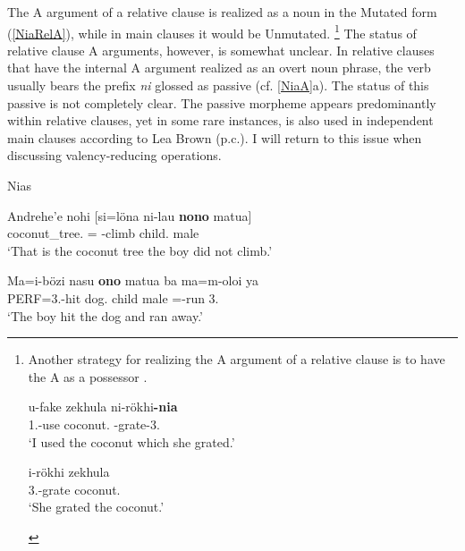 The A argument of a relative clause is realized as a noun in the Mutated form (\ref{NiaRelA}), while in main clauses it would be Unmutated.
\footnote{Another strategy for realizing the A argument of a relative clause is to have the A as a possessor \citep[420]{Brown:2001}. 

\begin{exe}\ex 
\begin{xlist}
\ex\gll u-fake zekhula ni-r\"okhi\textbf{-nia}\\
1\sg{}.\rls{}-use coconut.\mut{} \pass{}-grate-3\sg{}.\poss{}\\
`I used the coconut which she grated.' %

\ex\gll i-r\"okhi zekhula\\
3\sg{}.\rls{}-grate coconut.\mut{}\\
`She grated the coconut.'
\end{xlist} 
\end{exe}}
The status of relative clause A arguments, however, is somewhat unclear. 
In relative clauses that have the internal A argument realized as an overt noun phrase,  the verb usually bears the prefix \emph{ni} glossed as passive (cf. \ref{NiaA}a). 
The status of this passive is not completely clear. 
The passive morpheme appears predominantly within relative clauses, yet in some rare instances, is also used in independent main clauses according to Lea Brown (p.c.). 
I will return to this issue when discussing valency-reducing operations.

\enlargethispage{\baselineskip}
\begin{exe}\ex\label{NiaA} 
{Nias} \citep[422]{Brown:2001}\nopagebreak[4]
\begin{xlist} 
\ex\label{NiaRelA}\gll Andrehe'e  nohi {\rm[}si=l\"ona ni-lau \textbf{nono} matua{\rm]}\\
\dist{} coconut\_tree.\mut{} \relativ{}=\Neg{} \pass{}-climb child.\mut{} male\\
`That is the coconut tree the boy did not climb.'

\ex\label{NiaMainA}\gll Ma=i-b\"ozi nasu \textbf{ono} matua ba ma=m-oloi ya\\
PERF=3\sg{}.\rls{}-hit dog.\mut{} child male \conj{} \pfv{}=\dyn{}-run 3\sg{}.\mut{}\\
`The boy hit the dog and ran away.'
\end{xlist}%
\end{exe}


